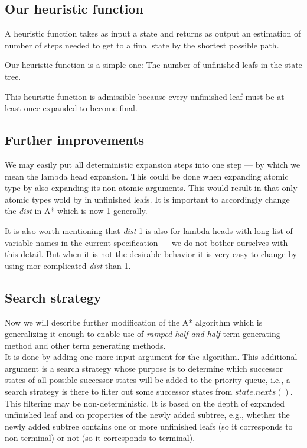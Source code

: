 \documentclass[12pt,a4paper]{report}
\begin{document}
\subsection{Our heuristic function}

A heuristic function takes as input a state and returns as output an estimation of number
of steps needed to get to a final state by the shortest possible path.

Our heuristic function is a simple one: The number of unfinished leafs in the state tree.

This heuristic function is admissible because every unfinished
leaf must be at least once expanded to become final. 


\subsection{Further improvements}

We may easily put all deterministic expansion steps into one step 
--- by which we mean the lambda head expansion. This could be
done when expanding atomic type by also expanding its 
non-atomic arguments. This would result in that only atomic types
wold by in unfinished leafs. It is important to accordingly change
the \textit{dist} in A* which is now 1 generally. 

It is also worth mentioning that \textit{dist} 1 is also for
lambda heads with long list of variable names in the current specification --- we do not bother ourselves with this detail.
But when it is not the desirable behavior it is very easy to change
by using mor complicated \textit{dist} than 1.



\subsection{Search strategy}

Now we will describe further modification of the A* algorithm 
which is generalizing it enough to enable use of \textit{ramped half-and-half}
term generating method and other term generating methods.\\


It is done by adding one more input argument for the algorithm.
This additional argument is a search strategy whose purpose is
to determine which successor states of all possible successor states 
will be added to the priority queue, i.e., a search strategy 
is there to filter out some successor states from $state.nexts()$.
This filtering may be non-deterministic. It is based on
the depth of expanded unfinished leaf and on properties of 
the newly added subtree, e.g., whether the newly added subtree
contains one or more unfinished leafs (so it corresponds to non-terminal) 
or not (so it corresponds to terminal). 
\end{document}
